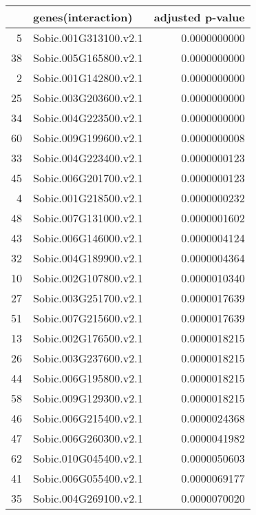 \documentclass[12pt, a4paper]{article}
\begin{document}
\newpage


\begin{table}[ht]
\centering
\scriptsize
\begin{tabular}{rlr}
  \hline
 & genes(interaction) & adjusted p-value \\   \hline
5 & Sobic.001G313100.v2.1 & 0.0000000000 \\ 
  38 & Sobic.005G165800.v2.1 & 0.0000000000 \\ 
  2 & Sobic.001G142800.v2.1 & 0.0000000000 \\ 
  25 & Sobic.003G203600.v2.1 & 0.0000000000 \\ 
  34 & Sobic.004G223500.v2.1 & 0.0000000000 \\ 
  60 & Sobic.009G199600.v2.1 & 0.0000000008 \\ 
  33 & Sobic.004G223400.v2.1 & 0.0000000123 \\ 
  45 & Sobic.006G201700.v2.1 & 0.0000000123 \\ 
  4 & Sobic.001G218500.v2.1 & 0.0000000232 \\ 
  48 & Sobic.007G131000.v2.1 & 0.0000001602 \\ 
  43 & Sobic.006G146000.v2.1 & 0.0000004124 \\ 
  32 & Sobic.004G189900.v2.1 & 0.0000004364 \\ 
  10 & Sobic.002G107800.v2.1 & 0.0000010340 \\ 
  27 & Sobic.003G251700.v2.1 & 0.0000017639 \\ 
  51 & Sobic.007G215600.v2.1 & 0.0000017639 \\ 
  13 & Sobic.002G176500.v2.1 & 0.0000018215 \\ 
  26 & Sobic.003G237600.v2.1 & 0.0000018215 \\ 
  44 & Sobic.006G195800.v2.1 & 0.0000018215 \\ 
  58 & Sobic.009G129300.v2.1 & 0.0000018215 \\ 
  46 & Sobic.006G215400.v2.1 & 0.0000024368 \\ 
  47 & Sobic.006G260300.v2.1 & 0.0000041982 \\ 
  62 & Sobic.010G045400.v2.1 & 0.0000050603 \\ 
  41 & Sobic.006G055400.v2.1 & 0.0000069177 \\ 
  35 & Sobic.004G269100.v2.1 & 0.0000070020 \\ 

\end{tabular}
\end{table}
\end{document}
